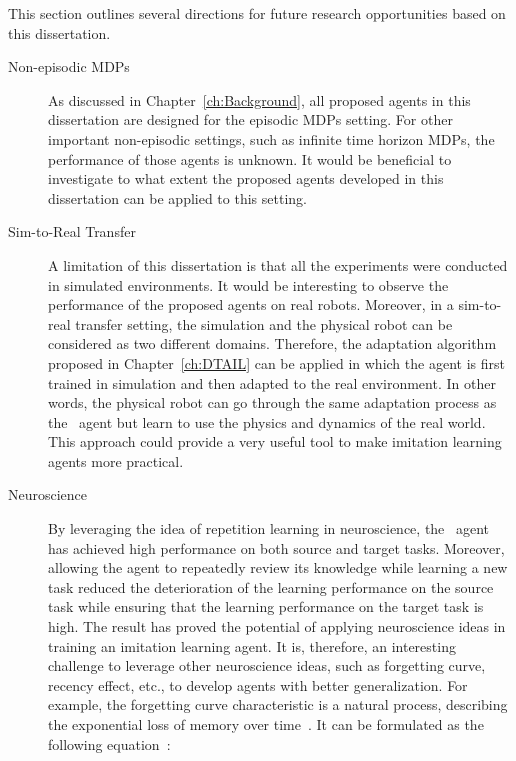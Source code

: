 This section outlines several directions for future research opportunities based on this dissertation.

\begin{description}

  \item[Non-episodic MDPs]
        As discussed in Chapter~\ref{ch:Background},
        all proposed agents in this dissertation are designed for the episodic MDPs setting.
        For other important non-episodic settings,
        such as infinite time horizon MDPs,
        the performance of those agents is unknown.
        It would be beneficial to investigate to what extent the proposed agents developed in this dissertation can be applied to this setting.

  \item[Sim-to-Real Transfer]
        A limitation of this dissertation is that all the experiments were conducted in simulated environments.
        It would be interesting to observe the performance of the proposed agents on real robots.
        Moreover,
        in a sim-to-real transfer setting,
        the simulation and the physical robot can be considered as two different domains.
        Therefore,
        the adaptation algorithm proposed in Chapter~\ref{ch:DTAIL} can be applied in which the agent is first trained in simulation and then adapted to the real environment.
        In other words,
        the physical robot can go through the same adaptation process as the \DTAIL\ agent but learn to use the physics and dynamics of the real world.
        This approach could provide a very useful tool to make imitation learning agents more practical.

  \item[Neuroscience]
        By leveraging the idea of repetition learning in neuroscience,
        the \DTAIL\ agent has achieved high performance on both source and target tasks.
        Moreover,
        allowing the agent to repeatedly review its knowledge while learning a new task reduced the deterioration of the learning performance on the source task while ensuring that the learning performance on the target task is high.
        The result has proved the potential of applying neuroscience ideas in training an imitation learning agent.
        It is,
        therefore,
        an interesting challenge to leverage other neuroscience ideas,
        such as forgetting curve,
        recency effect,
        etc.,
        to develop agents with better generalization.
        For example,
        the forgetting curve characteristic is a natural process,
        describing the exponential loss of memory over time~\cite{Neuroscience_Ebbinghaus2013}.
        It can be formulated as the following equation~\cite{Neuroscience_Ebbinghaus2013}:


\end{description}
